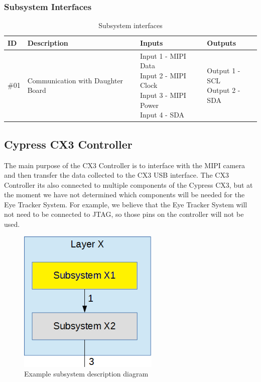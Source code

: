 \subsubsection{Subsystem Interfaces}

\begin {table}[H]
\caption {Subsystem interfaces}
\begin{center}
    \begin{tabular}{ | p{1cm} | p{6cm} | p{3cm} | p{3cm} |}
    \hline
    ID & Description & Inputs & Outputs \\ \hline
    \#01 & Communication with Daughter Board & \pbox{3cm}{Input 1 - MIPI Data \\ Input 2 - MIPI Clock \\ Input 3 - MIPI Power \\ Input 4 - SDA} & \pbox{3cm}{Output 1 - SCL \\ Output 2 - SDA}  \\ \hline
    \end{tabular}
\end{center}
\end{table}

\subsection{Cypress CX3 Controller}
The main purpose of the CX3 Controller is to interface with the MIPI camera and then transfer the data collected to the CX3 USB interface. The CX3 Controller its also connected to multiple components of the Cypress CX3, but at the moment we have not determined which components will be needed for the Eye Tracker System. For example, we believe that the Eye Tracker System will not need to be connected to JTAG, so those pins on the controller will not be used.

\begin{figure}[h!]
	\centering
 	\includegraphics[width=0.60\textwidth]{images/subsystem}
 \caption{Example subsystem description diagram}
\end{figure}

